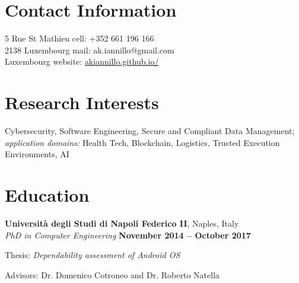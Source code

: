\documentclass[margin,line]{resume}
\newif\ifReferences
\newif\ifOnline
\begin{document}
\Referencesfalse
\Onlinefalse


\begin{resume}


\section{\mysidestyle Contact Information}
\ifOnline
	mail: ak.iannillo@gmail.com	 							\hfill Luxembourg\\
\else
    5 Rue St Mathieu				                   			\hfill cell: +352 661 196 166\\
    2138 Luxembourg								        \hfill mail: ak.iannillo@gmail.com\\
    Luxembourg										\hfill website: \url{akiannillo.github.io/}\\
\fi




\section{\mysidestyle Research Interests}
Cybersecurity, Software Engineering, Secure and Compliant Data Management;
\textit{application domains:} Health Tech, Blockchain, Logistics, Trusted Execution Environments, AI

\section{\mysidestyle Education}
\textbf{Universit\`a degli Studi di Napoli Federico II}, Naples, Italy \vspace{1mm}\\%
\textsl{PhD in Computer Engineering} \hfill \textbf{November 2014 -- October 2017}\vspace{-3mm}\\\vspace{-1mm}%
\begin{list2}
	\item Thesis: \textsl{Dependability assessment of Android OS}
	\item Advisors: Dr. Domenico Cotroneo and Dr. Roberto Natella
\end{list2}


\end{resume}
\end{document}
